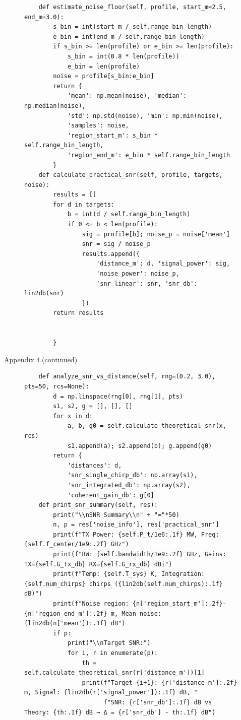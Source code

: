 \begin{figure}[H]
\centering
\begin{verbatim}
    def estimate_noise_floor(self, profile, start_m=2.5, end_m=3.0):
        s_bin = int(start_m / self.range_bin_length)
        e_bin = int(end_m / self.range_bin_length)
        if s_bin >= len(profile) or e_bin >= len(profile):
            s_bin = int(0.8 * len(profile))
            e_bin = len(profile)
        noise = profile[s_bin:e_bin]
        return {
            'mean': np.mean(noise), 'median': np.median(noise),
            'std': np.std(noise), 'min': np.min(noise),
            'samples': noise,
            'region_start_m': s_bin * self.range_bin_length,
            'region_end_m': e_bin * self.range_bin_length
        }
    def calculate_practical_snr(self, profile, targets, noise):
        results = []
        for d in targets:
            b = int(d / self.range_bin_length)
            if 0 <= b < len(profile):
                sig = profile[b]; noise_p = noise['mean']
                snr = sig / noise_p
                results.append({
                    'distance_m': d, 'signal_power': sig,
                    'noise_power': noise_p,
                    'snr_linear': snr, 'snr_db': lin2db(snr)
                })
        return results


        }
\end{verbatim}
\end{figure}


\newpage
\hfill \large Appendix 4.(continued)

\begin{figure}[H]
\centering
\begin{verbatim}
    def analyze_snr_vs_distance(self, rng=(0.2, 3.0), pts=50, rcs=None):
        d = np.linspace(rng[0], rng[1], pts)
        s1, s2, g = [], [], []
        for x in d:
            a, b, g0 = self.calculate_theoretical_snr(x, rcs)
            s1.append(a); s2.append(b); g.append(g0)
        return {
            'distances': d,
            'snr_single_chirp_db': np.array(s1),
            'snr_integrated_db': np.array(s2),
            'coherent_gain_db': g[0]
    def print_snr_summary(self, res):
        print("\\nSNR Summary\\n" + "="*50)
        n, p = res['noise_info'], res['practical_snr']
        print(f"TX Power: {self.P_t/1e6:.1f} MW, Freq: {self.f_center/1e9:.2f} GHz")
        print(f"BW: {self.bandwidth/1e9:.2f} GHz, Gains: TX={self.G_tx_db} RX={self.G_rx_db} dBi")
        print(f"Temp: {self.T_sys} K, Integration: {self.num_chirps} chirps ({lin2db(self.num_chirps):.1f} dB)")
        print(f"Noise region: {n['region_start_m']:.2f}-{n['region_end_m']:.2f} m, Mean noise: {lin2db(n['mean']):.1f} dB")
        if p:
            print("\\nTarget SNR:")
            for i, r in enumerate(p):
                th = self.calculate_theoretical_snr(r['distance_m'])[1]
                print(f"Target {i+1}: {r['distance_m']:.2f} m, Signal: {lin2db(r['signal_power']):.1f} dB, "
                      f"SNR: {r['snr_db']:.1f} dB vs Theory: {th:.1f} dB → Δ = {r['snr_db'] - th:.1f} dB")
\end{verbatim}
\end{figure}
